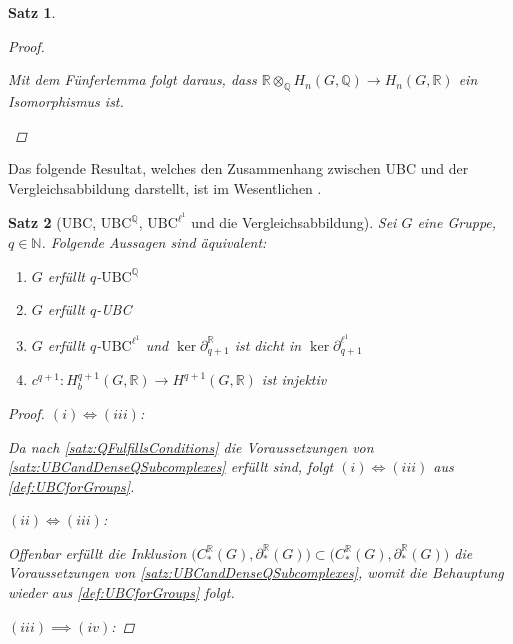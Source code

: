 \documentclass[a4paper,twoside,10pt]{scrreprt}
\newcommand{\UBC}{\text{UBC}}
\newcommand{\N}{\mathbb{N}}
\newcommand{\Q}{\mathbb{Q}}
\newcommand{\R}{\mathbb{R}}
\newtheorem{satz}{Satz}[section]
\theoremstyle{definition}
\begin{document}
\begin{satz}
\begin{proof}
\begin{itemize}
\begin{center}
\end{center}
Mit dem Fünferlemma folgt daraus, dass $\R\otimes_{\Q}H_n(G,\Q)\to H_n(G,\R)$ ein Isomorphismus ist.
\end{itemize}
\end{proof}
\end{satz}

Das folgende Resultat, welches den Zusammenhang zwischen UBC und der Vergleichsabbildung darstellt, ist im Wesentlichen \cite[Theorem 2.8]{matsumoto}.

\begin{satz}[UBC, $\UBC^{\Q}$, $\UBC^{\ell^1}$ und die Vergleichsabbildung]\label{satz:UBCandComparisonMap}
Sei $G$ eine Gruppe, $q\in \N$. Folgende Aussagen sind äquivalent:
\renewcommand{\labelenumi}{(\roman{enumi}) }
\begin{enumerate}
\item $G$ erfüllt $q$-$\UBC^{\Q}$
\item $G$ erfüllt $q$-UBC
\item $G$ erfüllt $q$-$\text{UBC}^{\ell^1}$ und $\ker \partial_{q+1}^{\R}$ ist dicht in $\ker \partial_{q+1}^{\ell^1}$
\item $c^{q+1}:H_b^{q+1}(G,\R)\to H^{q+1}(G,\R)$ ist injektiv
\end{enumerate}
\begin{proof}
$(i)\Longleftrightarrow(iii)$:\par
Da nach \cref{satz:QFulfillsConditions} die Voraussetzungen von \cref{satz:UBCandDenseQSubcomplexes} erfüllt sind, folgt $(i)\Longleftrightarrow(iii)$ aus \cref{def:UBCforGroups}.\par\noindent
$(ii)\Longleftrightarrow(iii)$:\par
Offenbar erfüllt die Inklusion $\bigl(C_*^{\R}(G),\partial_*^{\R}(G)\bigr)\subset (C_*^{\R}(G),\partial_*^{\R}(G)\bigr)$ die Voraussetzungen von \cref{satz:UBCandDenseQSubcomplexes}, womit die Behauptung wieder aus \cref{def:UBCforGroups} folgt.\par\noindent
$(iii)\implies (iv)$:\par

\end{proof}
\end{satz}
\end{document}
